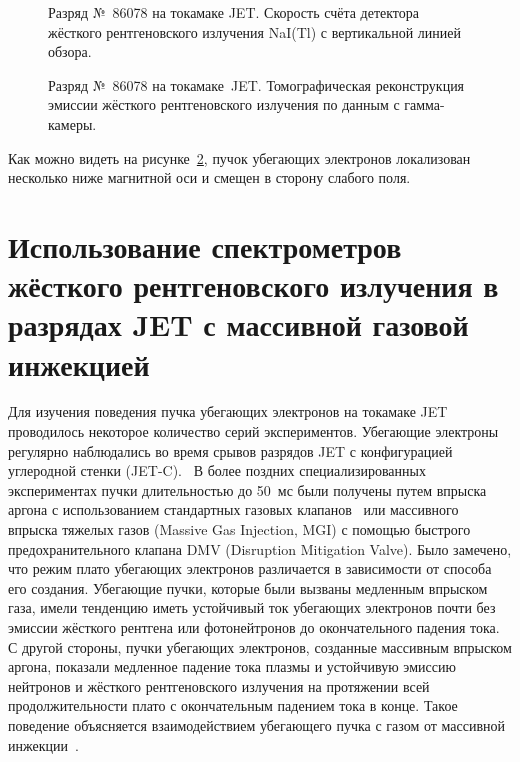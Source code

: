 \begin{figure}[ht!]
  \caption{ Разряд №~86078 на токамаке JET. Скорость счёта детектора жёсткого рентгеновского излучения NaI(Tl) с вертикальной линией обзора.~\cite{Plyusnin2015} }
  \label{fig:jetPulseHxrNaI86078}
\end{figure}

\begin{figure}[ht!]
  \caption{ Разряд №~86078 на токамаке~JET. Томографическая реконструкция эмиссии жёсткого рентгеновского излучения по данным с гамма-камеры.~\cite{Plyusnin2015} }
  \label{fig:jetPulseHxrTomography86078}
\end{figure}

Как можно видеть на рисунке~\ref{fig:jetPulseHxrTomography86078}, пучок убегающих электронов локализован несколько ниже магнитной оси и смещен в сторону слабого поля.



\FloatBarrier
\section{Использование спектрометров жёсткого рентгеновского излучения в разрядах JET с массивной газовой инжекцией}

Для изучения поведения пучка убегающих электронов на токамаке JET проводилось некоторое количество серий экспериментов. Убегающие электроны регулярно наблюдались во время срывов разрядов JET с конфигурацией углеродной стенки (JET-C).~\cite{Grill2002} В более поздних специализированных экспериментах пучки длительностью до 50~мс были получены путем впрыска аргона с использованием стандартных газовых клапанов~\cite{Plyusnin2006} или массивного впрыска тяжелых газов (Massive Gas Injection, MGI) с помощью быстрого предохранительного клапана DMV (Disruption Mitigation Valve). Было замечено, что режим плато убегающих электронов различается в зависимости от способа его создания. Убегающие пучки, которые были вызваны медленным впрыском газа, имели тенденцию иметь устойчивый ток убегающих электронов почти без эмиссии жёсткого рентгена или фотонейтронов до окончательного падения тока. С другой стороны, пучки убегающих электронов, созданные массивным впрыском аргона, показали медленное падение тока плазмы и устойчивую эмиссию нейтронов и жёсткого рентгеновского излучения на протяжении всей продолжительности плато с окончательным падением тока в конце. Такое поведение объясняется взаимодействием убегающего пучка с газом от массивной инжекции~\cite{Riccardo2010}.

